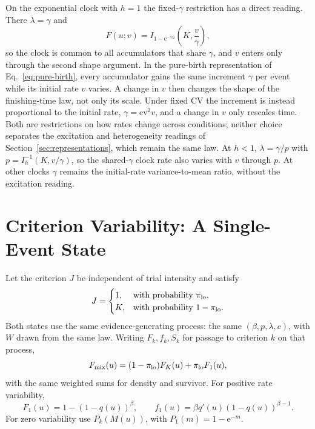 \documentclass[12pt]{article}
\newcommand{\e}{\mathrm{e}}
\theoremstyle{definition}
\theoremstyle{plain}
\theoremstyle{remark}
\begin{document}
On the exponential clock with $h=1$ the fixed-$\gamma$ restriction has a direct reading. There $\lambda=\gamma$ and
\begin{equation}
 F(u;v)=I_{1-\e^{-\gamma u}}\!\left(K,\frac v\gamma\right),\label{eq:fixed-gamma}
\end{equation}
so the clock is common to all accumulators that share $\gamma$, and $v$ enters only through the second shape argument. In the pure-birth representation of Eq.~\eqref{eq:pure-birth}, every accumulator gains the same increment $\gamma$ per event while its initial rate $v$ varies. A change in $v$ then changes the shape of the finishing-time law, not only its scale. Under fixed CV the increment is instead proportional to the initial rate, $\gamma=\mathrm{cv}^2v$, and a change in $v$ only rescales time. Both are restrictions on how rates change across conditions; neither choice separates the excitation and heterogeneity readings of Section~\ref{sec:representations}, which remain the same law. At $h<1$, $\lambda=\gamma/p$ with $p=I^{-1}_h(K,v/\gamma)$, so the shared-$\gamma$ clock rate also varies with $v$ through $p$. At other clocks $\gamma$ remains the initial-rate variance-to-mean ratio, without the excitation reading.

\section{Criterion Variability: A Single-Event State}\label{sec:mixture}

Let the criterion $J$ be independent of trial intensity and satisfy
\begin{equation}
 J=\begin{cases}1,&\text{with probability }\pi_{\rm lo},\\
 K,&\text{with probability }1-\pi_{\rm lo}.
 \end{cases}\label{eq:criterion-mixture}
\end{equation}
Both states use the same evidence-generating process: the same $(\beta,p,\lambda,c)$, with $W$ drawn from the same law. Writing $F_k,f_k,S_k$ for passage to criterion $k$ on that process,
\begin{equation}
 F_{\rm mix}(u)=(1-\pi_{\rm lo})F_K(u)+\pi_{\rm lo}F_1(u),\label{eq:mixture}
\end{equation}
with the same weighted sums for density and survivor. For positive rate variability,
\begin{equation}
 F_1(u)=1-(1-q(u))^\beta,\qquad
 f_1(u)=\beta q'(u)(1-q(u))^{\beta-1}.
\end{equation}
For zero variability use $P_k(M(u))$, with $P_1(m)=1-\e^{-m}$.
\end{document}
